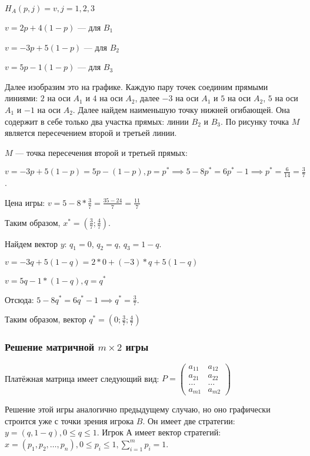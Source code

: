 \documentclass{article}
\begin{document}
$H_{A}(p, j) = v, j = 1,2,3$

$v = 2p+4(1-p)$ — для $B_1$

$v = -3p + 5(1-p)$ — для $B_2$

$v = 5p-1(1-p)$ — для $B_3$

Далее изобразим это на графике. Каждую пару точек соединим прямыми линиями: $2$ на оси $A_{1}$ и $4$ на оси $A_{2}$, далее $-3$ на оси $A_{1}$ и $5$ на оси $A_{2}$, $5$ на оси $A_{1}$ и $-1$ на оси $A_{2}$. Далее найдем наименьшую точку нижней огибающей. Она содержит в себе только два участка прямых: линии $B_{2}$ и $B_{3}$. По рисунку точка $M$ является пересечением второй и третьей линии.

$M$ — точка пересечения второй и третьей прямых:

$v = -3p+5(1-p) = 5p-(1-p), p=p^{*} \implies 5 - 8p^{*} = 6p^{*}-1 \implies p^{*} = \frac{6}{14} = \frac{3}{7}$.

Цена игры: $v = 5 - 8 * \frac{3}{7} = \frac{35 - 24}{7} = \frac{11}{7}$

Таким образом, $x^{*} = (\frac{3}{7}; \frac{4}{7})$.

Найдем вектор $y$: $q_{1} = 0$, $q_{2} = q$, $q_{3} = 1 - q$.

$v = -3q + 5(1-q) = 2 * 0 + (-3) * q + 5 (1 - q)$

$v = 5q - 1 * (1 - q), q = q^{*}$

Отсюда: $5 - 8q^{*} = 6q^{*} - 1 \implies q^{*} = \frac{3}{7}$.

Таким образом, вектор $q^{*}  = (0; \frac{3}{7}; \frac{4}{7})$

\subsubsection{Решение матричной $m \times 2$ игры}

Платёжная матрица имеет следующий вид: $P = \begin{pmatrix}
	a_{11} & a_{12} \\
	a_{21} & a_{22} \\
	\dots & \dots \\
	a_{m1} & a_{m2}
\end{pmatrix}$

Решение этой игры аналогично предыдущему случаю, но оно графически строится уже с точки зрения игрока $B$. Он имеет две стратегии: $y = (q, 1-q), 0 \le q \le 1$. Игрок А имеет вектор стратегий: $x = (p_1, p_2, \dots, p_n), 0 \le p_{i} \le 1, \sum\limits_{i = 1}^{m} p_{i} = 1$.
\end{document}

